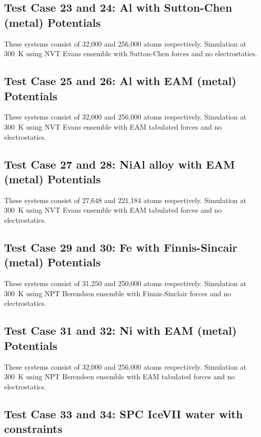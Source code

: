 \subsection{Test Case 23 and 24: Al with Sutton-Chen (metal) Potentials}

These systems consist of 32,000 and 256,000 atoms respectively.
Simulation at 300~K using NVT Evans ensemble with Sutton-Chen
forces and no electrostatics.

\subsection{Test Case 25 and 26: Al with EAM (metal) Potentials}

These systems consist of 32,000 and 256,000 atoms respectively.
Simulation at 300~K using NVT Evans ensemble with EAM tabulated
forces and no electrostatics.

\subsection{Test Case 27 and 28: NiAl alloy with EAM (metal) Potentials}

These systems consist of 27,648 and 221,184 atoms respectively.
Simulation at 300~K using NVT Evans ensemble with EAM tabulated
forces and no electrostatics.

\subsection{Test Case 29 and 30: Fe with Finnis-Sincair (metal) Potentials}

These systems consist of 31,250 and 250,000 atoms respectively.
Simulation at 300~K using NPT Berendsen ensemble with Finnis-Sinclair
forces and no electrostatics.

\subsection{Test Case 31 and 32: Ni with EAM (metal) Potentials}

These systems consist of 32,000 and 256,000 atoms respectively.
Simulation at 300~K using NPT Berendsen ensemble with EAM tabulated
forces and no electrostatics.

\subsection{Test Case 33 and 34: SPC IceVII water with constraints}

